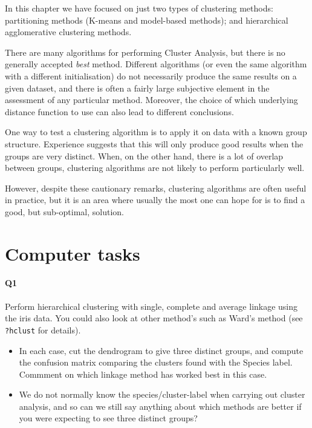 \documentclass[
]{book}
\providecommand{\tightlist}{%
  \setlength{\itemsep}{0pt}\setlength{\parskip}{0pt}}
\theoremstyle{definition}
\theoremstyle{definition}
\theoremstyle{definition}
\theoremstyle{definition}
\theoremstyle{remark}
\begin{document}
In this chapter we have focused on just two types of clustering methods: partitioning methods (K-means and model-based methods); and hierarchical agglomerative clustering methods.

There are many algorithms for performing Cluster Analysis, but there is no generally accepted \emph{best} method. Different algorithms (or even the same algorithm with a different initialisation) do not necessarily produce the same results on a given dataset, and there is often a fairly large subjective element in the assessment of any particular method. Moreover, the choice of which underlying distance function to use can also lead to different conclusions.

One way to test a clustering algorithm is to apply it on data with a known group structure. Experience suggests that this will only produce good results when the groups are very distinct. When, on the other hand, there is a lot of overlap between groups, clustering algorithms are not likely to perform particularly well.

However, despite these cautionary remarks, clustering algorithms are often useful in practice, but it is an area where usually the most one can hope for is to find a good, but sub-optimal, solution.

\section{Computer tasks}\label{computer-tasks-5}

\paragraph*{Q1}\label{q1}

Perform hierarchical clustering with single, complete and average linkage using the iris data. You could also look
at other method's such as Ward's method (see \texttt{?hclust} for details).

\begin{itemize}
\tightlist
\item
  In each case, cut the dendrogram to give three distinct groups, and compute the confusion matrix comparing the clusters found with the Species label.
  Commment on which linkage method has worked best in this case.
\end{itemize}

\begin{itemize}
\tightlist
\item
  We do not normally know the species/cluster-label when carrying out cluster analysis, and so can we still say anything about which methods are better if you were expecting to see three distinct groups?
\end{itemize}
\end{document}
